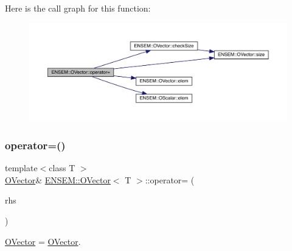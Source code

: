 Here is the call graph for this function\+:
\nopagebreak
\begin{figure}[H]
\begin{center}
\leavevmode
\includegraphics[width=350pt]{d0/d8d/classENSEM_1_1OVector_a31b08dda73879d2a39c4a0bec90bc401_cgraph}
\end{center}
\end{figure}
\mbox{\label{classENSEM_1_1OVector_af1d768a4392ac2caf7d93faef7b39ed2}} 
\subsubsection{\texorpdfstring{operator=()}{operator=()}\hspace{0.1cm}{\footnotesize\ttfamily [5/8]}}
{\footnotesize\ttfamily template$<$class T $>$ \\
\mbox{\hyperlink{classENSEM_1_1OVector}{O\+Vector}}\& \mbox{\hyperlink{classENSEM_1_1OVector}{E\+N\+S\+E\+M\+::\+O\+Vector}}$<$ T $>$\+::operator= (\begin{DoxyParamCaption}\item[{const \mbox{\hyperlink{classENSEM_1_1OVector}{O\+Vector}}$<$ T $>$ \&}]{rhs }\end{DoxyParamCaption})\hspace{0.3cm}{\ttfamily [inline]}}



\mbox{\hyperlink{classENSEM_1_1OVector}{O\+Vector}} = \mbox{\hyperlink{classENSEM_1_1OVector}{O\+Vector}}. 

